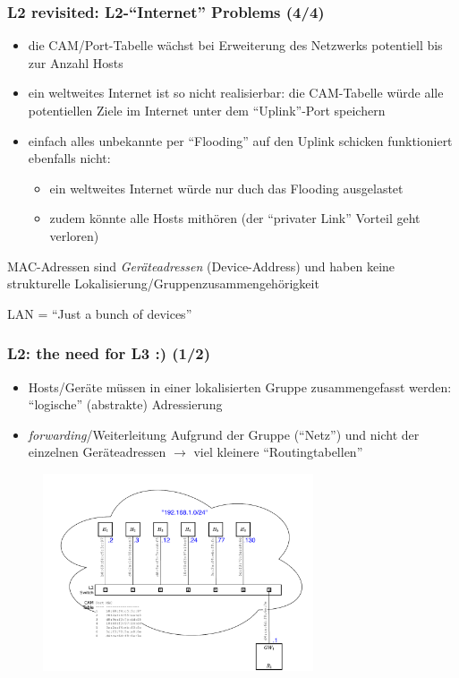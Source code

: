 \documentclass{beamer}
\begin{document}
\begin{frame}
\frametitle{L2 revisited: L2-``Internet'' Problems  (4/4)}
\begin{itemize}
  \item die CAM/Port-Tabelle w\"achst bei Erweiterung des Netzwerks potentiell bis zur Anzahl Hosts
  \item ein weltweites Internet ist so nicht realisierbar: die CAM-Tabelle w\"urde alle potentiellen Ziele im Internet unter dem ``Uplink''-Port speichern
  \item einfach alles unbekannte per ``Flooding'' auf den Uplink schicken funktioniert ebenfalls nicht:
    \begin{itemize}
      \item ein weltweites Internet w\"urde nur duch das Flooding ausgelastet
      \item zudem k\"onnte alle Hosts mith\"oren (der ``privater Link'' Vorteil geht verloren)
    \end{itemize}
\end{itemize}
\begin{block}{}
MAC-Adressen sind {\em Ger\"ateadressen} (Device-Address) und haben keine strukturelle Lokalisierung/Gruppenzusammengeh\"origkeit

\begin{center}LAN = ``Just a bunch of devices''\end{center}
\end{block}
\end{frame}

\begin{frame}
\frametitle{L2: the need for L3 :) (1/2)}
\begin{itemize}
  \item Hosts/Ger\"ate m\"ussen in einer lokalisierten Gruppe zusammengefasst werden: ``logische'' (abstrakte) Adressierung
  \item {\em forwarding}/Weiterleitung Aufgrund der Gruppe (``Netz'') und nicht der einzelnen Ger\"ateadressen $\rightarrow$ viel kleinere ``Routingtabellen''
\end{itemize}
\vspace{-0.2cm}
\begin{figure}{}
  \centering
  \includegraphics[width=8cm]{L2-base-network-L3-gateway.pdf}
\end{figure}
\end{frame}
\end{document}
